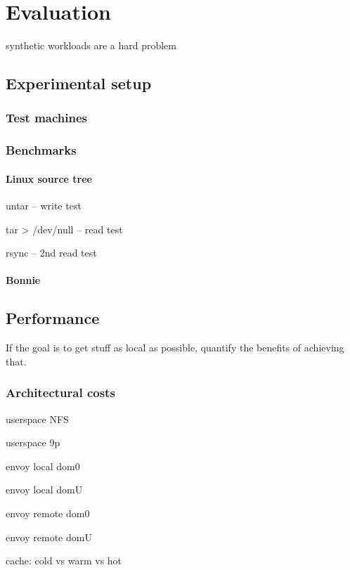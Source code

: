 \chapter{Evaluation}\label{cha:evaluation}

synthetic workloads are a hard problem \cite{ganger95}

\section{Experimental setup}

\subsection{Test machines}

\subsection{Benchmarks}

\subsubsection{Linux source tree}
untar -- write test

tar > /dev/null -- read test

rsync -- 2nd read test

\subsubsection{Bonnie}

\section{Performance}

If the goal is to get stuff as local as possible, quantify the benefits of achieving that.

\subsection{Architectural costs}

userspace NFS

userspace 9p

envoy local dom0

envoy local domU

envoy remote dom0

envoy remote domU

cache: cold vs warm vs hot

